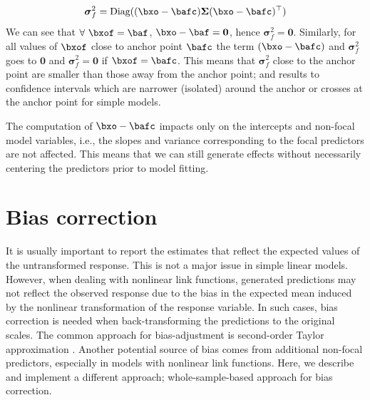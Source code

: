 %
\begin{align}\label{eq:centered_variance}
\boldsymbol\sigma_f^2 = \textrm{Diag}((\bxo - \bafc) \boldsymbol{\Sigma} (\bxo - \bafc)^\top)
\end{align}
%
We can see that $\forall ~\bxof=\baf$, $\bxo - \baf = \boldsymbol 0$, hence $\boldsymbol\sigma_f^2 = \boldsymbol{0}$. Similarly, for all values of $\bxof$ close to anchor point $\bafc$ the term $(\bxo - \bafc)$ and $\boldsymbol\sigma_f^2$ goes to $\boldsymbol 0$ and $\boldsymbol\sigma_f^2 = \boldsymbol 0$ if $\bxof=\bafc$. This means that $\boldsymbol\sigma_f^2$ close to the anchor point are smaller than those away from the anchor point; and results to confidence intervals which are narrower (isolated) around the anchor or crosses at the anchor point for simple models.


The computation of $\bxo - \bafc$ impacts only on the intercepts and non-focal model variables, i.e., the slopes and variance corresponding to the focal predictors are not affected. This means that we can still generate effects without necessarily centering the predictors prior to model fitting.


\section{Bias correction}

It is usually important to report the estimates that reflect the expected values of the untransformed response. This is not a major issue in simple linear models. However, when dealing with nonlinear link functions,  generated predictions may not reflect the observed response due to the bias in the expected mean induced by the nonlinear transformation of the response variable. In such cases, bias correction is needed when back-transforming the predictions to the original scales. The common approach for bias-adjustment is second-order Taylor approximation \citep{lenth2018package, duursma2003bias}. Another potential source of bias comes from additional non-focal predictors, especially in models with nonlinear link functions. Here, we describe and implement a different approach; whole-sample-based approach for bias correction.


